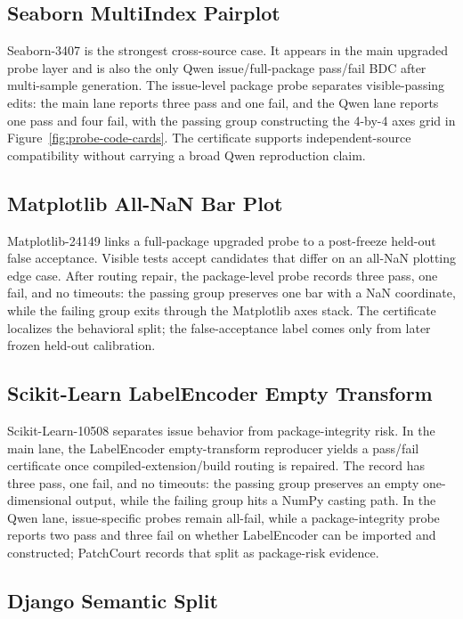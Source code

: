 \documentclass[conference]{IEEEtran}
\newcommand{\patchcourt}{PatchCourt\xspace}
\begin{document}
\subsection{Seaborn MultiIndex Pairplot}

Seaborn-3407 is the strongest cross-source case.
It appears in the main upgraded probe layer and is also the only Qwen issue/full-package pass/fail BDC after multi-sample generation.
The issue-level package probe separates visible-passing edits: the main lane reports three pass and one fail, and the Qwen lane reports one pass and four fail, with the passing group constructing the 4-by-4 axes grid in Figure~\ref{fig:probe-code-cards}.
The certificate supports independent-source compatibility without carrying a broad Qwen reproduction claim.

\subsection{Matplotlib All-NaN Bar Plot}

Matplotlib-24149 links a full-package upgraded probe to a post-freeze held-out false acceptance.
Visible tests accept candidates that differ on an all-NaN plotting edge case.
After routing repair, the package-level probe records three pass, one fail, and no timeouts: the passing group preserves one bar with a NaN coordinate, while the failing group exits through the Matplotlib axes stack.
The certificate localizes the behavioral split; the false-acceptance label comes only from later frozen held-out calibration.

\subsection{Scikit-Learn LabelEncoder Empty Transform}

Scikit-Learn-10508 separates issue behavior from package-integrity risk.
In the main lane, the LabelEncoder empty-transform reproducer yields a pass/fail certificate once compiled-extension/build routing is repaired.
The record has three pass, one fail, and no timeouts: the passing group preserves an empty one-dimensional output, while the failing group hits a NumPy casting path.
In the Qwen lane, issue-specific probes remain all-fail, while a package-integrity probe reports two pass and three fail on whether LabelEncoder can be imported and constructed; \patchcourt records that split as package-risk evidence.

\subsection{Django Semantic Split}
\end{document}
